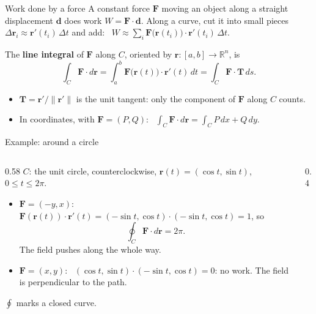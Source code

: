 \documentclass[10pt]{wosm-slides}
\newcommand{\R}{\mathbb{R}}
\newcommand{\norm}[1]{\lVert #1 \rVert}
\newcommand{\vr}{\mathbf{r}}
\newcommand{\vF}{\mathbf{F}}
\newcommand{\vT}{\mathbf{T}}
\begin{document}
\begin{frame}{Work done by a force}
  A constant force $\vF$ moving an object along a straight displacement $\mathbf d$ does work
  $W = \vF \cdot \mathbf d$. Along a curve, cut it into small pieces $\Delta\vr_i \approx \vr'(t_i)\, \Delta t$
  and add: \ $W \approx \sum_i \vF\bigl(\vr(t_i)\bigr) \cdot \vr'(t_i)\, \Delta t$.
  \pause
  \begin{definition}
    The \textbf{line integral} of $\vF$ along $C$, oriented by $\vr\colon [a, b] \to \R^n$, is
    \[ \int_C \vF \cdot d\vr = \int_a^b \vF\bigl(\vr(t)\bigr) \cdot \vr'(t)\, dt = \int_C \vF \cdot \vT\, ds . \]
  \end{definition}
  \begin{itemize}
    \item $\vT = \vr' / \norm{\vr'}$ is the unit tangent: only the component of $\vF$ along $C$ counts.
    \item In coordinates, with $\vF = (P, Q)$: \ $\int_C \vF \cdot d\vr = \int_C P\, dx + Q\, dy$.
  \end{itemize}
\end{frame}

\begin{frame}{Example: around a circle}
  \begin{columns}[c]
    \begin{column}{0.58\textwidth}
      $C$: the unit circle, counterclockwise, $\vr(t) = (\cos t, \sin t)$, $0 \le t \le 2\pi$.
      \pause
      \begin{itemize}
        \item $\vF = (-y, x)$: \ $\vF(\vr(t)) \cdot \vr'(t) = (-\sin t, \cos t) \cdot (-\sin t, \cos t) = 1$, so
          \[ \oint_C \vF \cdot d\vr = 2\pi . \]
          The field pushes along the whole way.
        \pause
        \item $\vF = (x, y)$: \ $(\cos t, \sin t) \cdot (-\sin t, \cos t) = 0$: no work. The field is
          perpendicular to the path.
      \end{itemize}
      {\small $\oint$ marks a closed curve.\par}
    \end{column}
    \begin{column}{0.4\textwidth}
      \centering
    \end{column}
  \end{columns}
\end{frame}
\end{document}
